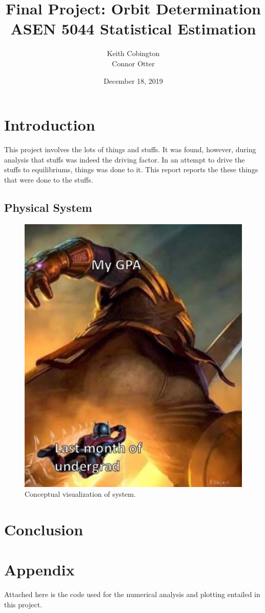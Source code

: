 \documentclass[11pt, a4paper]{article}
\begin{document}
\title{Final Project: Orbit Determination\\ ASEN 5044 Statistical Estimation}
\author{Keith Cobington\\Connor Otter}
\date{December 18, 2019}
\maketitle




\section{Introduction}
This project involves the lots of things and stuffs. 
It was found, however, during analysis that stuffs was indeed the driving factor.
In an attempt to drive the stuffs to equilibriums, things was done to it. 
This report reports the these things that were done to the stuffs. 


\subsection{Physical System}
\begin{figure}[H]
	\centering
	\includegraphics[width=.4\textwidth]{./Figures/system_setup.png}
	\caption{Conceptual visualization of system.}
	\label{fig: system}
\end{figure}




\section{Conclusion}




\newpage
\section*{Appendix}
Attached here is the code used for the numerical analysis and plotting entailed in this project.
%
\end{document}
